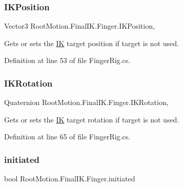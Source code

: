 \subsubsection{\texorpdfstring{I\+K\+Position}{IKPosition}}
{\footnotesize\ttfamily Vector3 Root\+Motion.\+Final\+I\+K.\+Finger.\+I\+K\+Position\hspace{0.3cm}{\ttfamily [get]}, {\ttfamily [set]}}



Gets or sets the \mbox{\hyperlink{class_root_motion_1_1_final_i_k_1_1_i_k}{IK}} target position if target is not used. 



Definition at line 53 of file Finger\+Rig.\+cs.

\mbox{\label{class_root_motion_1_1_final_i_k_1_1_finger_a23f205bf349624ed830df25e7e9e7bb9}} 
\subsubsection{\texorpdfstring{I\+K\+Rotation}{IKRotation}}
{\footnotesize\ttfamily Quaternion Root\+Motion.\+Final\+I\+K.\+Finger.\+I\+K\+Rotation\hspace{0.3cm}{\ttfamily [get]}, {\ttfamily [set]}}



Gets or sets the \mbox{\hyperlink{class_root_motion_1_1_final_i_k_1_1_i_k}{IK}} target rotation if target is not used. 



Definition at line 65 of file Finger\+Rig.\+cs.

\mbox{\label{class_root_motion_1_1_final_i_k_1_1_finger_acb849481d6e0992851e8dfd2315291fd}} 
\subsubsection{\texorpdfstring{initiated}{initiated}}
{\footnotesize\ttfamily bool Root\+Motion.\+Final\+I\+K.\+Finger.\+initiated\hspace{0.3cm}{\ttfamily [get]}}



